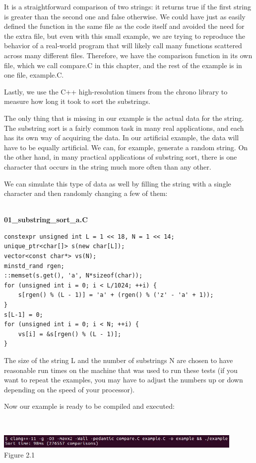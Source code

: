 It is a straightforward comparison of two strings: it returns true if the first string is greater than the second one and false otherwise. We could have just as easily defined the function in the same file as the code itself and avoided the need for the extra file, but even with this small example, we are trying to reproduce the behavior of a real-world program that will likely call many functions scattered across many different files. Therefore, we have the comparison function in its own file, which we call compare.C in  this chapter, and the rest of the example is in one file, example.C.

Lastly, we use the C++ high-resolution timers from the chrono library to measure how long it took to sort the substrings.

The only thing that is missing in our example is the actual data for the string. The substring sort is a fairly common task in many real applications, and each has its own way of acquiring the data. In our artificial example, the data will have to be equally artificial. We can, for example, generate a random string. On the other hand, in many practical applications of substring sort, there is one character that occurs in the string much more often than any other.

We can simulate this type of data as well by filling the string with a single character and then randomly changing a few of them:

\hspace*{\fill} \\ %
\noindent
\textbf{01\_substring\_sort\_a.C}
\begin{lstlisting}[style=styleCXX]
constexpr unsigned int L = 1 << 18, N = 1 << 14;
unique_ptr<char[]> s(new char[L]);
vector<const char*> vs(N);
minstd_rand rgen;
::memset(s.get(), 'a', N*sizeof(char));
for (unsigned int i = 0; i < L/1024; ++i) {
	s[rgen() % (L - 1)] = 'a' + (rgen() % ('z' - 'a' + 1));
}
s[L-1] = 0;
for (unsigned int i = 0; i < N; ++i) {
	vs[i] = &s[rgen() % (L - 1)];
}
\end{lstlisting}

The size of the string L and the number of substrings N are chosen to have reasonable run times on the machine that was used to run these tests (if you want to repeat the examples, you may have to adjust the numbers up or down depending on the speed of your processor).

Now our example is ready to be compiled and executed:

\hspace*{\fill} \\ %
\begin{center}
\includegraphics[width=0.9\textwidth]{content/1/chapter2/images/1.jpg}\\
Figure 2.1
\end{center}

